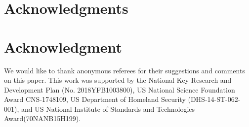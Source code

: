 \documentclass[journal,12pt,onecolumn,draftclsnofoot,]{IEEEtran}
\begin{document}
\ifCLASSOPTIONcompsoc
  \section*{Acknowledgments}
\else
  \section*{Acknowledgment}
\fi


We would like to thank anonymous referees for their suggestions and comments on this paper. This work was supported by the National Key Research and Development Plan (No. 2018YFB1003800), US National Science Foundation Award CNS-1748109, US Department of Homeland Security (DHS-14-ST-062-001), and US National Institute of Standards and Technologies Award(70NANB15H199).


\ifCLASSOPTIONcaptionsoff
  \newpage
\fi








%
%
%

%
\end{document}
